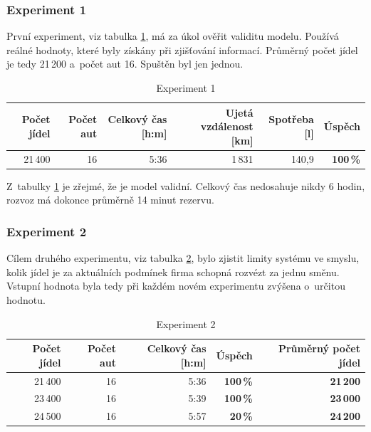 \documentclass[a4paper, 11pt]{article}
\begin{document}
	\subsubsection{Experiment 1}

	První experiment, viz tabulka \ref{table:experiment1}, má za úkol ověřit
	validitu modelu. Používá reálné hodnoty, které byly získány při zjišťování
	informací. Průměrný počet jídel je tedy 21\,200 a~počet aut 16. Spuštěn
	byl jen jednou.

	\begin{table}[ht]
		\centering
		\begin{tabular}{|r|r|r|r|r|r|}
			\hline
			Počet jídel & Počet aut & Celkový čas [h:m]
				& Ujetá vzdálenost [km] & Spotřeba [l]
				& \textbf{Úspěch} \\ \hline

			21\,400 & 16 & 5:36 & 1\,831 & 140,9 & \textbf{100\,\%} \\ \hline
		\end{tabular}

		\caption{Experiment 1}
		\label{table:experiment1}
	\end{table}

	Z~tabulky \ref{table:experiment1} je zřejmé, že je model validní. Celkový
	čas nedosahuje nikdy 6 hodin, rozvoz má dokonce průměrně 14 minut rezervu.

	\subsubsection{Experiment 2}

	Cílem druhého experimentu, viz tabulka \ref{table:experiment2}, bylo
	zjistit limity systému ve smyslu, kolik jídel je za aktuálních podmínek
	firma schopná rozvézt za jednu směnu. Vstupní hodnota 
	byla tedy při každém novém experimentu zvýšena o~určitou hodnotu.

	\begin{table}[ht]
		\centering
		\begin{tabular}{|r|r|r|r|r|}
			\hline
			Počet jídel & Počet aut & Celkový čas [h:m] & \textbf{Úspěch}
				& \textbf{Průměrný počet jídel} \\ \hline

			21\,400 & 16 & 5:36 & \textbf{100\,\%} & \textbf{21\,200} \\ \hline
			23\,400 & 16 & 5:39 & \textbf{100\,\%} & \textbf{23\,000} \\ \hline
			24\,500 & 16 & 5:57 & \textbf{20\,\%}  & \textbf{24\,200} \\ \hline
		\end{tabular}

		\caption{Experiment 2}
		\label{table:experiment2}
	\end{table}
\end{document}
